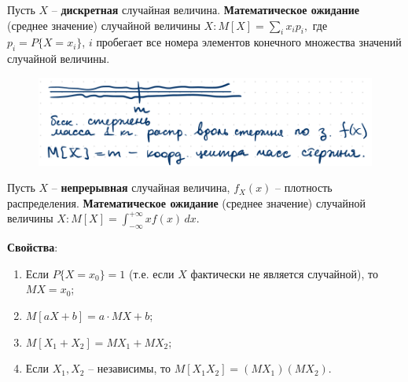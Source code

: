 Пусть $X$ -- \textbf{дискретная} случайная величина. \textbf{Математическое ожидание} (среднее значение) случайной величины $X: M[X] = \sum_{i} x_ip_i,$ где $p_i = P\{X=x_i\}$, $i$ пробегает все номера элементов конечного множества значений случайной величины.

\begin{figure}
	\includegraphics[width=\linewidth]{img/3.png}
\end{figure}  

Пусть $X$ -- \textbf{непрерывная} случайная величина, $f_X(x)$ -- плотность распределения. \textbf{Математическое ожидание} (среднее значение) случайной величины $X: M[X] = \int_{-\infty}^{+\infty} xf(x)\, dx$.


\textbf{Свойства}:
\begin{enumerate}
	\item Если $P\{X = x_0\} = 1$ (т.е. если $X$ фактически не является случайной), то $MX = x_0$;
	\item $M[aX + b] = a \cdot MX + b$;
	\item $M[X_1 + X_2] = MX_1 + MX_2$;
	\item Если $X_1, X_2$ -- независимы, то $M[X_1X_2] = (MX_1)(MX_2)$.
\end{enumerate}

